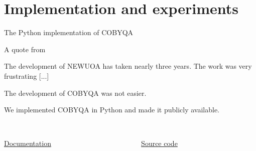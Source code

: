 \documentclass[
]{presentation}
\begin{document}
\section{Implementation and experiments}

\begin{frame}{The Python implementation of COBYQA}
    \begin{block}{A quote from \textcite{Powell_2006}}
        \begin{quoting}
            \small%
            The development of NEWUOA has taken nearly \alert{three years}.
            The work was very \alert{frustrating} [...]
        \end{quoting}
        The development of COBYQA was not easier.
    \end{block}

    \smallskip

    We implemented COBYQA in \alert{Python} and made it publicly available.

    \smallskip

    \begin{columns}
        \begin{column}{0.5\textwidth}
            \begin{center}
                \\[1ex]
                \href{https://www.cobyqa.com/}{Documentation}
            \end{center}
        \end{column}
        \begin{column}{0.5\textwidth}
            \begin{center}
                \\[1ex]
                \href{https://github.com/cobyqa/cobyqa/}{Source code}
            \end{center}
        \end{column}
    \end{columns}
\end{frame}
\end{document}
